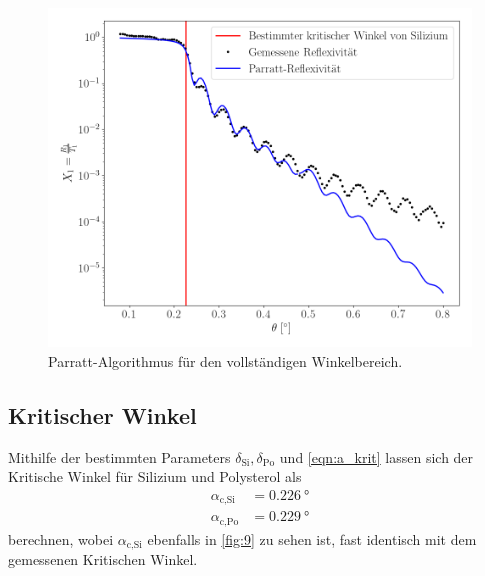 \documentclass[12pt]{article}
\begin{document}
\begin{figure}[H]
  \centering
  \includegraphics[scale=0.5]{Ressourcen/parrattf.png}
  \caption{Parratt-Algorithmus für den vollständigen Winkelbereich.}\label{fig:10}
\end{figure}
\subsection{Kritischer Winkel}
Mithilfe der bestimmten Parameters $\delta_\text{Si},\delta_\text{Po}$ und \autoref{eqn:a_krit} lassen sich der Kritische Winkel für Silizium und Polysterol als
\begin{align*}
  \alpha_\text{c,Si}&=\SI{0.226}{\degree}\\
  \alpha_\text{c,Po}&=\SI{0.229}{\degree}
\end{align*}
berechnen, wobei $\alpha_\text{c,Si}$ ebenfalls in \autoref{fig:9} zu sehen ist, fast identisch mit dem gemessenen Kritischen Winkel.
\end{document}
